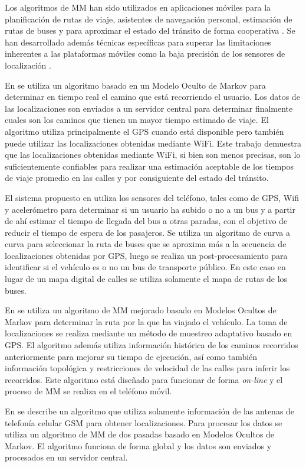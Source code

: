 Los algoritmos de MM han sido utilizados en aplicaciones móviles para la planificación de rutas de viaje, asistentes de navegación personal, estimación de rutas de buses y para aproximar el estado del tránsito de forma cooperativa \citep{thiagarajan2010cooperative, thiagarajan2009vtrack}. Se han desarrollado además técnicas específicas para superar las limitaciones inherentes a las plataformas móviles como la baja precisión de los sensores de localización  \citep{thiagarajan2011accurate, fang2011enacq}.

En \citep{thiagarajan2009vtrack} se utiliza un algoritmo basado en un Modelo Oculto de Markov para determinar en tiempo real el camino que está recorriendo el usuario. Los datos de las localizaciones son enviados a un servidor central para determinar finalmente cuales son los caminos que tienen un mayor tiempo estimado de viaje. El algoritmo utiliza principalmente el GPS cuando está disponible pero también puede utilizar las localizaciones obtenidas mediante WiFi. Este trabajo demuestra que las localizaciones obtenidas mediante WiFi, si bien son menos precisas, son lo suficientemente confiables para realizar una estimación aceptable de los tiempos de viaje promedio en las calles y por consiguiente del estado del tránsito.

El sistema propuesto en \citep{thiagarajan2010cooperative} utiliza los sensores del teléfono, tales como de GPS, Wifi y acelerómetro para determinar si un usuario ha subido o no a un bus y a partir de ahí estimar el tiempo de llegada del bus a otras paradas, con el objetivo de reducir el tiempo de espera de los pasajeros. Se utiliza un algoritmo de curva a curva para seleccionar la ruta de buses que se aproxima más a la secuencia de localizaciones obtenidas por GPS, luego se realiza un post-procesamiento para identificar si el vehículo es o no un bus de transporte público. En este caso en lugar de un mapa digital de calles se utiliza solamente el mapa de rutas de los buses.

En \citep{fang2011enacq} se utiliza un algoritmo de MM mejorado basado en Modelos Ocultos de Markov para determinar la ruta por la que ha viajado el vehículo. La toma de localizaciones se realiza mediante un método de muestreo adaptativo basado en GPS. El algoritmo además utiliza información histórica de los caminos recorridos anteriormente  para mejorar su tiempo de ejecución, así como también información topológica y restricciones de velocidad de las calles para inferir los recorridos. Este algoritmo está diseñado para funcionar de forma \emph{on-line} y el proceso de MM se realiza en el teléfono móvil.

En \citep{thiagarajan2011accurate} se describe un algoritmo que utiliza solamente información de las antenas de telefonía celular GSM para obtener localizaciones. Para procesar los datos se utiliza un algoritmo de MM de dos pasadas basado en Modelos Ocultos de Markov. El algoritmo funciona de forma global y los datos son enviados y procesados en un servidor central.
